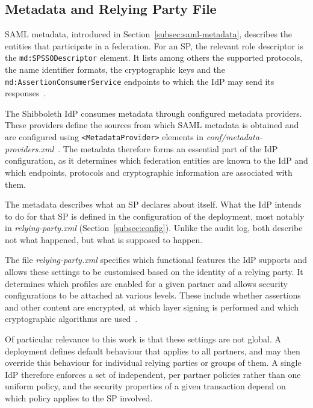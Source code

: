 \documentclass[../main.tex]{subfiles}
\begin{document}
\subsection{Metadata and Relying Party File}\label{subsec:static-configuration}

SAML metadata, introduced in Section~\ref{subsec:saml-metadata}, describes the entities that 
participate in a federation. 
For an SP, the relevant role descriptor is the \texttt{md:SPSSODescriptor} element. 
It lists among others the supported protocols, the name identifier formats, the cryptographic keys 
and the \texttt{md:Assertion\allowbreak{}Consumer\allowbreak{}Service} endpoints to which the IdP 
may send its responses~\cite{MetadataForSP}. 

The Shibboleth IdP consumes metadata through configured metadata providers. 
These providers define the sources from which SAML metadata is obtained and are configured using 
\texttt{<MetadataProvider>} elements in \textit{conf/metadata-providers.xml}~\cite{MetadataConfiguration}. 
The metadata therefore forms an essential part of the IdP configuration, as it determines which 
federation entities are known to the IdP and which endpoints, protocols and cryptographic 
information are associated with them. 

The metadata describes what an SP declares about itself. 
What the IdP intends to do for that SP is defined in the configuration of the deployment, most 
notably in \textit{relying-party.xml} (Section~\ref{subsec:config}). 
Unlike the audit log, both describe not what happened, but what is supposed to happen. 

The file \textit{relying-party.xml} specifies which functional features the IdP supports and allows these 
settings to be customised based on the identity of a relying party. 
It determines which profiles are enabled for a given partner and allows security configurations 
to be attached at various levels. 
These include whether assertions and other content are encrypted, at which layer signing is 
performed and which cryptographic algorithms are used~\cite{RelyingPartyConfiguration}. 

Of particular relevance to this work is that these settings are not global. 
A deployment defines default behaviour that applies to all partners, and may then override this 
behaviour for individual relying parties or groups of them. 
A single IdP therefore enforces a set of independent, per partner policies rather than one uniform 
policy, and the security properties of a given transaction depend on which policy applies to the 
SP involved. 
\end{document}
